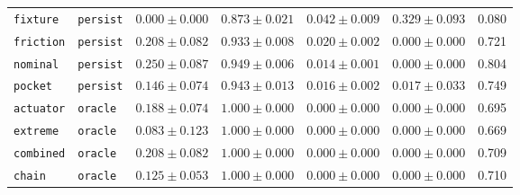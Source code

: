 \documentclass{article}
\begin{document}
\begin{center}
\begin{tabular}{llccccc}
\texttt{fixture} & \texttt{persist} & $0.000 \pm 0.000$ & $0.873 \pm 0.021$ & $0.042 \pm 0.009$ & $0.329 \pm 0.093$ & 0.080 \\
\texttt{friction} & \texttt{persist} & $0.208 \pm 0.082$ & $0.933 \pm 0.008$ & $0.020 \pm 0.002$ & $0.000 \pm 0.000$ & 0.721 \\
\texttt{nominal} & \texttt{persist} & $0.250 \pm 0.087$ & $0.949 \pm 0.006$ & $0.014 \pm 0.001$ & $0.000 \pm 0.000$ & 0.804 \\
\texttt{pocket} & \texttt{persist} & $0.146 \pm 0.074$ & $0.943 \pm 0.013$ & $0.016 \pm 0.002$ & $0.017 \pm 0.033$ & 0.749 \\
\texttt{actuator} & \texttt{oracle} & $0.188 \pm 0.074$ & $1.000 \pm 0.000$ & $0.000 \pm 0.000$ & $0.000 \pm 0.000$ & 0.695 \\
\texttt{extreme} & \texttt{oracle} & $0.083 \pm 0.123$ & $1.000 \pm 0.000$ & $0.000 \pm 0.000$ & $0.000 \pm 0.000$ & 0.669 \\
\texttt{combined} & \texttt{oracle} & $0.208 \pm 0.082$ & $1.000 \pm 0.000$ & $0.000 \pm 0.000$ & $0.000 \pm 0.000$ & 0.709 \\
\texttt{chain} & \texttt{oracle} & $0.125 \pm 0.053$ & $1.000 \pm 0.000$ & $0.000 \pm 0.000$ & $0.000 \pm 0.000$ & 0.710 \\
\bottomrule
\end{tabular}
\end{center}
\end{document}
